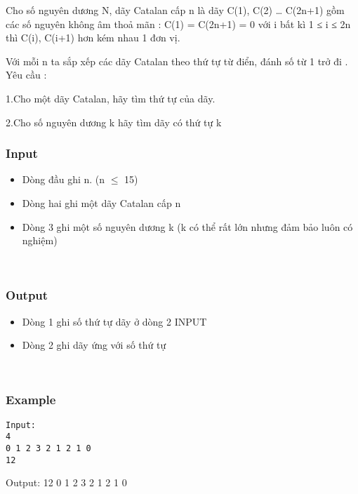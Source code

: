 

Cho số nguyên dương N, dãy Catalan cấp n là dãy C(1), C(2) … C(2n+1) gồm các số nguyên không âm thoả mãn : C(1) = C(2n+1) = 0 với i bất kì 1 ≤ i ≤ 2n thì C(i), C(i+1) hơn kém nhau 1 đơn vị.

Với mỗi n ta sắp xếp các dãy Catalan theo thứ tự từ điển, đánh số từ 1 trở đi . Yêu cầu :

1.Cho một dãy Catalan, hãy tìm thứ tự của dãy.

2.Cho số nguyên dương k hãy tìm dãy có thứ tự k

\subsubsection{Input}
\begin{itemize}
	\item Dòng đầu ghi n. (n  $\le$  15)
	\item Dòng hai ghi một dãy Catalan cấp n
	\item Dòng 3 ghi một số nguyên dương k (k có thể rất lớn nhưng đảm bảo luôn có nghiệm)
\end{itemize}

 

\subsubsection{Output}
\begin{itemize}
	\item Dòng 1 ghi số thứ tự dãy ở dòng 2 INPUT
	\item Dòng 2 ghi dãy ứng với số thứ tự
\end{itemize}

 

\subsubsection{Example}
\begin{verbatim}
Input:
4
0 1 2 3 2 1 2 1 0
12\end{verbatim}

Output: 12 0 1 2 3 2 1 2 1 0
